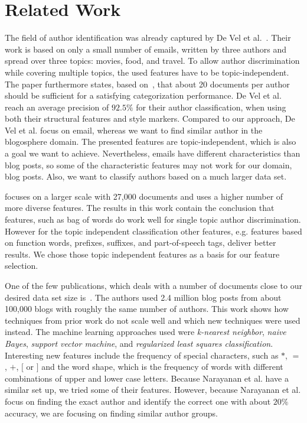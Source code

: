 
\section{Related Work}
\label{sec:related}


The field of author identification was already captured by De Vel et al.~\cite{de2001mining}.
Their work is based on only a small number of emails, written by three authors and spread over three topics: movies, food, and travel.
To allow author discrimination while covering multiple topics, the used features have to be topic-independent.
The paper furthermore states, based on~\cite{corney2001identifying}, that about 20 documents per author should be sufficient for a satisfying categorization performance.
De Vel et al. reach an average precision of $92.5\%$ for their author classification, when using both their structural features and style markers.
Compared to our approach, De Vel et al. focus on email, whereas we want to find similar author in the blogosphere domain.
The presented features are topic-independent, which is also a goal we want to achieve.
Nevertheless, emails have different characteristics than blog posts, so some of the characteristic features may not work for our domain, blog posts.
Also, we want to classify authors based on a much larger data set.


\cite{madigan2005author} focuses on a larger scale with 27,000 documents and uses a higher number of more diverse features.
The results in this work contain the conclusion that features, such as bag of words do work well for single topic author discrimination.
However for the topic independent classification other features, e.g. features based on function words, prefixes, suffixes, and part-of-speech tags, deliver better results.
We chose those topic independent features as a basis for our feature selection.


One of the few publications, which deals with a number of documents close to our desired data set size is~\cite{narayanan2012feasibility}.
The authors used 2.4 million blog posts from about 100,000 blogs with roughly the same number of authors.
This work shows how techniques from prior work do not scale well and which new techniques were used instead.
The machine learning approaches used were \textit{k-nearest neighbor}, \textit{naive Bayes}, \textit{support vector machine}, and \textit{regularized least squares classification}.
Interesting new features include the frequency of special characters, such as $*$, $=$, $+$, $[$ or $]$ and the word shape, which is the frequency of words with different combinations of upper and lower case letters.
Because Narayanan et al. have a similar set up, we tried some of their features.
However, because Narayanan et al. focus on finding the exact author and identify the correct one with about $20\%$ accuracy, we are focusing on finding similar author groups.


